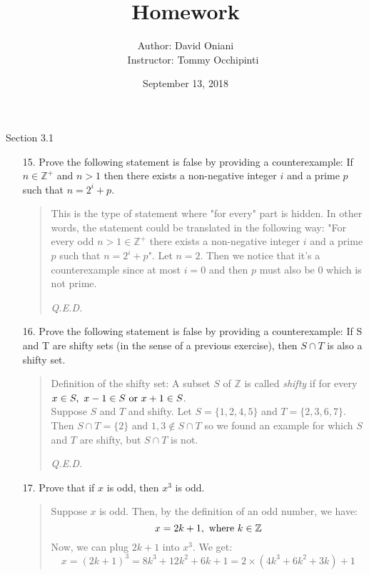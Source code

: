 \documentclass[12pt, a4paper]{article}                      %
\title{\bf{Homework \textnumero 4}}
\author{Author: David Oniani
\\
\ \ \ Instructor: Tommy Occhipinti}
\date{September 13, 2018}
\begin{document}
\maketitle

{\large Section 3.1}
\\

\begin{enumerate}
\item[15.]
Prove the following statement is false by providing a counterexample: If $n \in \mathbb{Z}^+$
and $n > 1$ then there exists a non-negative integer $i$ and a prime $p$ such that $n = 2^i + p$.
\\

\begin{quote}
This is the type of statement where "for every" part is hidden. In other words,
the statement could be translated in the following way: "For every odd $n > 1 \in \mathbb{Z}^+$
there exists a non-negative integer $i$ and a prime $p$ such that
$n = 2^i + p$". Let $n = 2$. Then we notice that it's a counterexample since
at most $i = 0$ and then $p$ must also be 0 which is not prime.
\begin{flushright}
\textit{Q.E.D.}
\end{flushright}
\end{quote}

\item[16.]
Prove the following statement is false by providing a counterexample:
If S and T are shifty sets (in the sense of a previous exercise), then $S \cap T$ is also a shifty set.
\begin{quote}
Definition of the shifty set: A subset $S$ of $\mathbb{Z}$ is called \textit{shifty} if for every $x \in S, \ x-1 \in S \ \textnormal{or} \ x + 1 \in S$.\\

Suppose $S$ and $T$ and shifty. Let $S = \{1,2,4,5\}$ and $T = \{2,3,6,7\}$.
Then $S \cap T = \{2\}$ and $1, 3 \notin S \cap T$ so we found an example for which
$S$ and $T$ are shifty, but $S \cap T$ is not.
\begin{flushright}
\textit{Q.E.D.}
\end{flushright}
\end{quote}

\item[17.]
Prove that if $x$ is odd, then $x^3$ is odd.

\begin{quote}
Suppose $x$ is odd. Then, by the definition of an odd number, we have:
$$x = 2k + 1, \ \textnormal{where} \ k \in \mathbb{Z}$$
Now, we can plug $2k + 1$ into $x^3$. We get:
$$
x = (2k + 1)^3 = 8k^3 + 12k^2 + 6k + 1 = 2 \times (4k^3 + 6k^2 + 3k) + 1
$$


\end{quote}
\end{enumerate}
\end{document}
